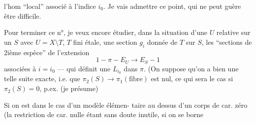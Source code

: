 
l'hom ``local''
associé à l'indice $i_0$. Je vais admettre
ce point, qui ne peut guère être difficile.


Pour terminer ce n°, je veux encore
étudier, dans la situation d'une
$U$  relative sur un $S$ avec
 $U=X\setminus T$,  $T$ fini étale, une section
$g_i$ donnée de $T$ sur $S$, les ``sections de
2ième espèce'' de l'extension
\[
1-\pi-E_U\longrightarrow E_S-1
\]
associées à $i=i_0$ --- qui définit une  
 $L_{i_0}$ dans $\pi$. (On suppose qu'on
a bien une telle suite exacte, i.e. que
$\pi_2(S)\longrightarrow\pi_1(\text{fibre})$ est nul, ce qui sera
le cas si $\pi_2(S)=0$, p.ex. (je présume)


Si on est dans le cas d'un modèle élémen-
taire au dessus d'un corps de car.
zéro (la restriction de car. nulle
étant sans doute inutile, si on se borne

